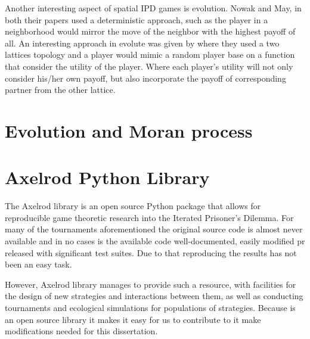 Another interesting aspect of spatial IPD games is evolution. Nowak and May, in
both their papers used a deterministic approach, such as the player in a
neighborhood would mirror the move of the neighbor with the highest payoff of
all.  An interesting approach in evolute was given by
\parencite{Meng&Xia_etc2015} where they used a two lattices topology  and a
player would mimic a random player base on a function that consider the utility
of the player. Where each player’s utility will not only consider his/her own
payoff, but also incorporate the payoff of corresponding partner from the other
lattice.

\section{Evolution and Moran process}

\section{Axelrod Python Library}

The Axelrod library is an open source Python package that allows for
reproducible game theoretic research into the Iterated Prisoner's Dilemma.  For
many of the tournaments aforementioned the original source code is almost never
available and in no cases is the available code well-documented, easily modified
pr released with significant test suites. Due to that reproducing the results
has not been an easy task.

However, Axelrod library manages to provide such a resource, with facilities for
the design of new strategies and interactions between them, as well as
conducting tournaments and ecological simulations for populations of strategies.
Because is an open source library it makes it easy for us to contribute to it
make modifications needed for this dissertation.

